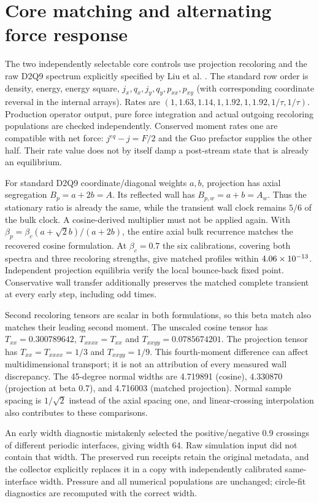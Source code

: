 \section{Core matching and alternating force response}
The two independently selectable core controls use projection recoloring
and the raw D2Q9 spectrum explicitly specified by Liu et al.
\cite{liu2015}. The standard row order is density, energy, energy square,
$j_x,q_x,j_y,q_y,p_{xx},p_{xy}$ (with corresponding coordinate reversal
in the internal arrays). Rates are
$(1,1.63,1.14,1,1.92,1,1.92,1/\tau,1/\tau)$.
Production operator output, pure force integration and actual outgoing
recoloring populations are checked independently. Conserved moment rates
one are compatible with net force: $j^{eq}-j=F/2$ and the Guo prefactor
supplies the other half. Their rate value does not by itself damp a
post-stream state that is already an equilibrium.

For standard D2Q9 coordinate/diagonal weights $a,b$, projection has axial
segregation $B_p=a+2b=A$. Its reflected wall has $B_{p,w}=a+b=A_w$.
Thus the stationary ratio is already the same, while the transient wall
clock remains $5/6$ of the bulk clock. A cosine-derived multiplier must
not be applied again. With
$\beta_p=\beta_c(a+\sqrt{2}b)/(a+2b)$, the entire axial bulk recurrence
matches the recovered cosine formulation. At $\beta_c=0.7$ the six
calibrations, covering both spectra and three recoloring strengths,
give matched profiles within $4.06\times10^{-13}$.
Independent projection equilibria verify the local bounce-back fixed
point. Conservative wall transfer additionally preserves the matched
complete transient at every early step, including odd times.

Second recoloring tensors are scalar in both formulations, so this beta
match also matches their leading second moment. The unscaled cosine
tensor has $T_{xx}=0.300789642$, $T_{xxxx}=T_{xx}$ and
$T_{xxyy}=0.0785674201$. The projection tensor has
$T_{xx}=T_{xxxx}=1/3$ and $T_{xxyy}=1/9$.
This fourth-moment difference can affect multidimensional transport;
it is not an attribution of every measured wall discrepancy.
The 45-degree normal widths are 4.719891 (cosine), 4.330870
(projection at beta 0.7), and 4.716003 (matched projection).
Normal sample spacing is $1/\sqrt2$ instead of the axial spacing one,
and linear-crossing interpolation also contributes to these comparisons.

An early width diagnostic mistakenly selected the positive/negative
0.9 crossings of different periodic interfaces, giving width 64.
Raw simulation input did not contain that width. The preserved run
receipts retain the original metadata, and the collector explicitly
replaces it in a copy with independently calibrated same-interface width.
Pressure and all numerical populations are unchanged; circle-fit
diagnostics are recomputed with the correct width.

